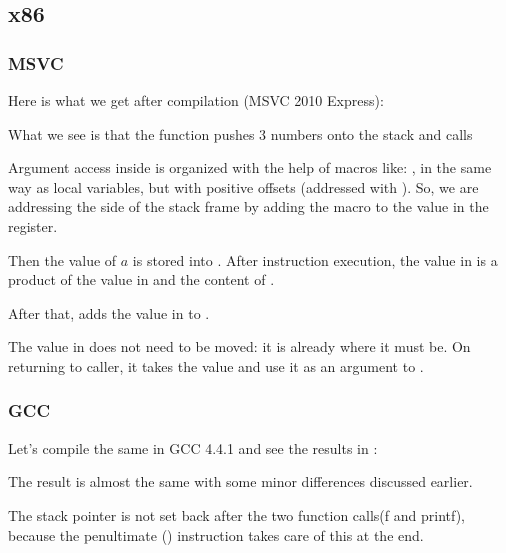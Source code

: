 \subsection{x86}

\subsubsection{MSVC}

Here is what we get after compilation (MSVC 2010 Express):




What we see is that the \main function pushes 3 numbers onto the stack and calls  

Argument access inside \ttf is organized with the help of macros like: , 
in the same way as local variables, but with positive offsets (addressed with ).
So, we are addressing the  side of the \gls{stack frame} by adding the  macro to the value in the \EBP register.


Then the value of $a$ is stored into \EAX. After \IMUL instruction execution, the value in \EAX is 
a \gls{product} of the value in \EAX and the content of .

After that, \ADD adds the value in  to \EAX.

The value in \EAX does not need to be moved: it is already where it must be.
On returning to \gls{caller}, it takes the \EAX value and use it as an argument to \printf.



\subsubsection{GCC}

Let's compile the same in GCC 4.4.1 and see the results in \IDA:



The result is almost the same with some minor differences discussed earlier.

The \gls{stack pointer} is not set back after the two function calls(f and printf), 
because the penultimate  () 
instruction takes care of this at the end.
